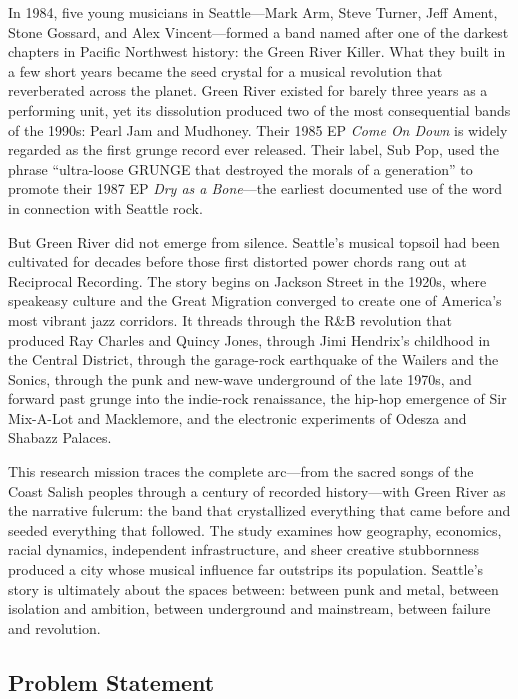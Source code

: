 \documentclass[11pt,letterpaper]{article}
\begin{document}
In 1984, five young musicians in Seattle---Mark Arm, Steve Turner, Jeff Ament, Stone Gossard, and Alex Vincent---formed a band named after one of the darkest chapters in Pacific Northwest history: the Green River Killer. What they built in a few short years became the seed crystal for a musical revolution that reverberated across the planet. Green River existed for barely three years as a performing unit, yet its dissolution produced two of the most consequential bands of the 1990s: Pearl Jam and Mudhoney. Their 1985 EP \textit{Come On Down} is widely regarded as the first grunge record ever released. Their label, Sub Pop, used the phrase ``ultra-loose GRUNGE that destroyed the morals of a generation'' to promote their 1987 EP \textit{Dry as a Bone}---the earliest documented use of the word in connection with Seattle rock.

But Green River did not emerge from silence. Seattle's musical topsoil had been cultivated for decades before those first distorted power chords rang out at Reciprocal Recording. The story begins on Jackson Street in the 1920s, where speakeasy culture and the Great Migration converged to create one of America's most vibrant jazz corridors. It threads through the R\&B revolution that produced Ray Charles and Quincy Jones, through Jimi Hendrix's childhood in the Central District, through the garage-rock earthquake of the Wailers and the Sonics, through the punk and new-wave underground of the late 1970s, and forward past grunge into the indie-rock renaissance, the hip-hop emergence of Sir Mix-A-Lot and Macklemore, and the electronic experiments of Odesza and Shabazz Palaces.

This research mission traces the complete arc---from the sacred songs of the Coast Salish peoples through a century of recorded history---with Green River as the narrative fulcrum: the band that crystallized everything that came before and seeded everything that followed. The study examines how geography, economics, racial dynamics, independent infrastructure, and sheer creative stubbornness produced a city whose musical influence far outstrips its population. Seattle's story is ultimately about the spaces between: between punk and metal, between isolation and ambition, between underground and mainstream, between failure and revolution.

\subsection{Problem Statement}
\end{document}
